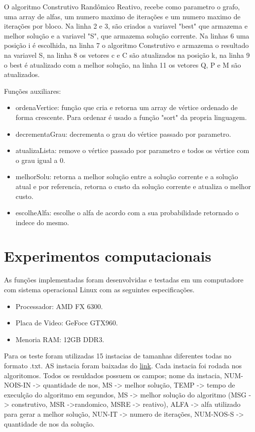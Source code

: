 \documentclass[12pt, fleqn]{article}
\begin{document}
\begin{itemize}
 	      \par O algoritmo Construtivo Randômico Reativo, recebe como parametro o grafo, uma array de alfas, um numero maximo de iterações e um numero maximo de iterações por bloco.
		   Na linha 2 e 3, são criados  a variavel "best" que armazema e melhor solução  e a variavel "S", que armazema solução corrente.
		   Na linhas 6 uma posição i é escolhida, na linha 7 o algoritmo Construtivo e armazema o resultado na variavel S, na linha 8 os vetores c e C são atualizados na posição k,
		   na linha 9 o best é atualizado com a melhor solução, na linha 11 os vetores Q, P e M são atualizados.
	      
	  \end{itemize}	  
	  
	
	\quad Funções auxiliares: 
	  \begin{itemize}
	    \item ordenaVertice: função que cria e retorna um array de vértice ordenado de forma crescente. Para ordenar é usado a função "sort" da propria linguagem.	      
	    \item decrementaGrau: decrementa o grau do vértice passado por parametro.
	    \item atualizaLista: remove o vértice passado por parametro e todos os vértice com o grau igual a 0.
	    \item melhorSolu: retorna a melhor solução entre a solução corrente e a solução atual e por referencia, retorna o custo da solução corrente e atualiza o melhor custo.
	    \item escolheAlfa: escolhe o alfa de acordo com a sua probabilidade retornado o indece do mesmo.
	     
	  \end{itemize}

    \section{Experimentos computacionais}
      \par As funções implementadas foram desenvolvidas e testadas em um computadore com sistema operacional Linux com as seguintes especificações.
      \begin{itemize}
	  \item Processador: AMD FX 6300.
	  \item Placa de Video: GeFoce GTX960.
	  \item Menoria RAM: 12GB DDR3.
      \end{itemize}
      \par Para os teste foram utilizadas 15 instacias de tamanhas diferentes todas no formato .txt. AS instacia foram baixadas do \href{http://dimacs11.cs.princeton.edu/instances/SPG-PUCN.zip}{link}.
      Cada instacia foi rodada nos algoritomos. Todos os resuldados possuem os campos; nome da instacia, NUM-NOIS-IN -> quantidade de nos, MS -> melhor solução,
      TEMP -> tempo de execulção do algoritmo em segundos, MS -> melhor solução do algoritmo (MSG -> construtivo, MSR ->randomico, MSRE -> reativo),
      ALFA -> alfa utilizado para gerar a melhor solução, NUN-IT -> numero de iterações, NUM-NOS-S -> quantidade de nos da solução.
      
\end{document}
